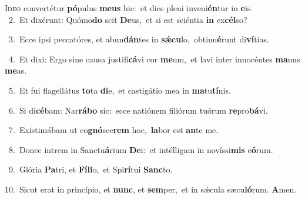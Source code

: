 \lettrine{\initial\textcolor{\initialcolor}{I}}{deo} convertétur \textbf{pó}\-pulus \textbf{me}\-\textbf{us} hic:~\star et dies pleni inveni\-\textbf{én}\-tur in \textbf{e}\-is.\\
{\numbfont\textcolor{\numbcolor}{~2.}}~Et dixérunt: Quómo\textbf{do} scit \textbf{De}\-us,~\star et si est sciéntia \textbf{in} ex\-\textbf{cél}\-so?\par
{\numbfont\textcolor{\numbcolor}{~3.}}~Ecce ipsi peccatóres, et abun\-\textbf{dán}\-tes in \textbf{sǽ}\-\textbf{cu}lo,~\star obtinu\-\textbf{é}\-runt di\-\textbf{ví}\-tias.\par
{\numbfont\textcolor{\numbcolor}{~4.}}~Et dixi: Ergo sine causa justifi\-\textbf{cá}\-vi cor \textbf{me}\-um,~\star et lavi inter innocéntes \textbf{ma}\-nus \textbf{me}\-as.\par
{\numbfont\textcolor{\numbcolor}{~5.}}~Et fui flagellátus \textbf{to}\-ta \textbf{di}\-e,~\star et castigátio mea in \textbf{ma}\-tu\-\textbf{tí}\-nis.\par
{\numbfont\textcolor{\numbcolor}{~6.}}~Si di\-\textbf{cé}\-bam: Nar\-\textbf{rá}\-\textbf{bo} sic:~\star ecce natiónem filiórum tuórum \textbf{re}\-pro\-\textbf{bá}\-vi.\par
{\numbfont\textcolor{\numbcolor}{~7.}}~Existimábam ut co\-\textbf{gnó}\-sce\textbf{rem} hoc,~\star \textbf{la}\-bor est \textbf{an}\-te me.\par
{\numbfont\textcolor{\numbcolor}{~8.}}~Donec intrem in Sanctu\-\textbf{á}\-rium \textbf{De}\-i:~\star et intélligam in novíssi\textbf{mis} e\-\textbf{ó}\-rum.\par
{\numbfont\textcolor{\numbcolor}{~9.}}~Glória \textbf{Pa}\-tri, et \textbf{Fí}\-\textbf{li}o,~\star et Spi\-\textbf{rí}\-tui \textbf{Sanc}\-to.\par
{\numbfont\textcolor{\numbcolor}{10.}}~Sicut erat in princípio, et \textbf{nunc}\-, et \textbf{sem}\-per,~\star et in sǽcula sæcu\-\textbf{ló}\-rum. \textbf{A}\-men.\par
